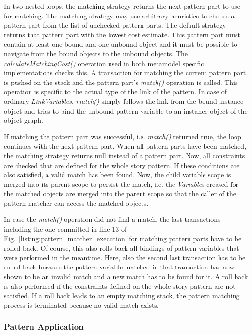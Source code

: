In two nested loops, the matching strategy returns the next pattern part to use for matching.
The matching strategy may use arbitrary heuristics to choose a pattern part from the list of unchecked pattern parts.
The default strategy returns that pattern part with the lowest cost estimate.
This pattern part must contain at least one bound and one unbound object and it must be possible to navigate from the bound objects to the unbound objects.
The \emph{calculateMatchingCost()} operation used in both metamodel specific implementations checks this.
A transaction for matching the current pattern part is pushed on the stack and the pattern part's \emph{match()} operation is called.
This operation is specific to the actual type of the link of the pattern.
In case of ordinary \emph{LinkVariables}, \emph{match()} simply follows the link from the bound instance object and tries to bind the unbound pattern variable to an instance object of the object graph.

If matching the pattern part was successful, i.e. \emph{match()} returned true, the loop continues with the next pattern part.
When all pattern parts have been matched, the matching strategy returns null instead of a pattern part.
Now, all constraints are checked that are defined for the whole story pattern.
If these conditions are also satisfied, a valid match has been found.
Now, the child variable scope is merged into its parent scope to persist the match, i.e. the \emph{Variable}s created for the matched objects are merged into the parent scope so that the caller of the pattern matcher can access the matched objects.

In case the \emph{match()} operation did not find a match, the last transactions including the one committed in line 13 of Fig.~\ref{listing:pattern_matcher_execution} for matching pattern parts have to be rolled back.
Of course, this also rolls back all bindings of pattern variables that were performed in the meantime.
Here, also the second last transaction has to be rolled back because the pattern variable matched in that transaction has now shown to be an invalid match and a new match has to be found for it.
A roll back is also performed if the constraints defined on the whole story pattern are not satisfied.
If a roll back leads to an empty matching stack, the pattern matching process is terminated because no valid match exists.


\subsubsection{Pattern Application}
\label{sec:spm_pattern_application}

